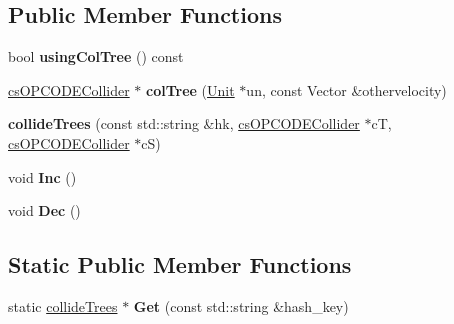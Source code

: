 \subsection*{Public Member Functions}
\begin{DoxyCompactItemize}
\item 
bool {\bfseries using\+Col\+Tree} () const \hypertarget{structcollideTrees_ae26812cb8bbd5b2bdd09f823ec294a32}{}\label{structcollideTrees_ae26812cb8bbd5b2bdd09f823ec294a32}

\item 
\hyperlink{classcsOPCODECollider}{cs\+O\+P\+C\+O\+D\+E\+Collider} $\ast$ {\bfseries col\+Tree} (\hyperlink{classUnit}{Unit} $\ast$un, const Vector \&othervelocity)\hypertarget{structcollideTrees_a892dac007838d45bcdd9f45b40f1f3a8}{}\label{structcollideTrees_a892dac007838d45bcdd9f45b40f1f3a8}

\item 
{\bfseries collide\+Trees} (const std\+::string \&hk, \hyperlink{classcsOPCODECollider}{cs\+O\+P\+C\+O\+D\+E\+Collider} $\ast$cT, \hyperlink{classcsOPCODECollider}{cs\+O\+P\+C\+O\+D\+E\+Collider} $\ast$cS)\hypertarget{structcollideTrees_ad1f95188cdeb979cbb9e4e2824125be2}{}\label{structcollideTrees_ad1f95188cdeb979cbb9e4e2824125be2}

\item 
void {\bfseries Inc} ()\hypertarget{structcollideTrees_ab2a08017d961c7eac3a3307e47ffe560}{}\label{structcollideTrees_ab2a08017d961c7eac3a3307e47ffe560}

\item 
void {\bfseries Dec} ()\hypertarget{structcollideTrees_a1895d1f70188b7d841a7a22179524394}{}\label{structcollideTrees_a1895d1f70188b7d841a7a22179524394}

\end{DoxyCompactItemize}
\subsection*{Static Public Member Functions}
\begin{DoxyCompactItemize}
\item 
static \hyperlink{structcollideTrees}{collide\+Trees} $\ast$ {\bfseries Get} (const std\+::string \&hash\+\_\+key)\hypertarget{structcollideTrees_a754e57ef7e249db8a3edb7974d7a4bcb}{}\label{structcollideTrees_a754e57ef7e249db8a3edb7974d7a4bcb}

\end{DoxyCompactItemize}
